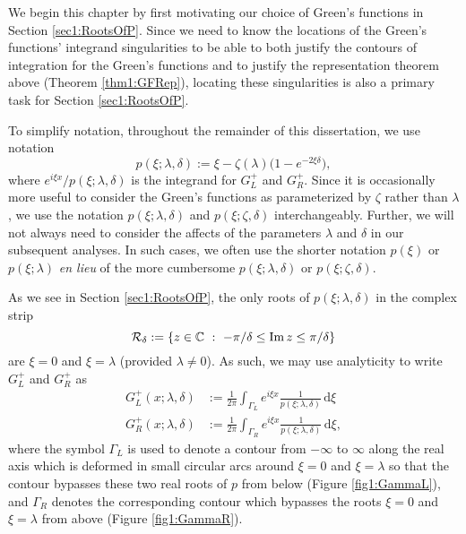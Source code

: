 \documentclass[../dissertation.tex]{subfiles}
\begin{document}
We begin this chapter by first motivating our choice of Green's functions
in Section \ref{sec1:RootsOfP}. 
Since we need to know the locations of the 
Green's functions' integrand singularities to be able to both justify 
the contours of integration for the Green's functions and
to justify the representation theorem above (Theorem \ref{thm1:GFRep}), 
locating these singularities is also a primary task for Section 
\ref{sec1:RootsOfP}.

To simplify notation, throughout the remainder of this dissertation, we use notation
\[
	p(\xi; \lambda, \delta) := \xi - \zeta(\lambda) \big( 1-e^{-2\xi \delta} \big),
	\label{sym:GFintegrand}
\]
where $e^{i\xi x} / p(\xi; \lambda, \delta)$ is the integrand for $G_L^+$ and $G_R^+$.
Since it is occasionally more useful to consider the Green's functions as parameterized 
by $\zeta$ rather than $\lambda$, we use the notation $p(\xi; \lambda, \delta)$ and
$p(\xi; \zeta, \delta)$ interchangeably. Further, we will not always need to consider
the affects of the parameters $\lambda$ and $\delta$ in our subsequent analyses. In 
such cases, we often use the shorter notation $p(\xi)$ or $p(\xi;\lambda)$ \textit{en lieu} 
of the more cumbersome $p(\xi; \lambda, \delta)$ or $p(\xi; \zeta, \delta)$.

As we see in Section \ref{sec1:RootsOfP}, the only roots of $p(\xi; \lambda, \delta)$ 
in the complex strip 
\[
	\mathcal R_\delta := \{z \in \mathbb C ~:~ -\pi/\delta \leq \operatorname{Im} z \leq \pi/\delta \}	
\]
\label{sym1:Rcal}
are $\xi = 0$ and $\xi = \lambda$ (provided $\lambda \ne 0$). As such, we may
use analyticity to write $G_L^+$ and $G_R^+$ as \label{sym:GFbndry}
\begin{align*}
	G_L^+(x; \lambda, \delta)
		&:= 
			\frac{1}{2\pi} 
			\int_{\Gamma_L} 
				e^{i\xi x} \frac{1}{p(\xi; \lambda, \delta)} 
			\, \mathrm{d}\xi \\
	G_R^+(x; \lambda, \delta) 
		&:= 
			\frac{1}{2\pi} 
				\int_{\Gamma_R} 
					e^{i\xi x} \frac{1}{p(\xi; \lambda, \delta)} 
				\, \mathrm{d}\xi,
\end{align*}
where the symbol $\Gamma_L$ \label{sym:Gamma} is used to denote a contour from $-\infty$ to 
$\infty$ along the real axis which is deformed in small circular arcs around 
$\xi = 0$ and $\xi=\lambda$ so that the contour bypasses these two real roots 
of $p$ from below (Figure \ref{fig1:GammaL}), and $\Gamma_R$ denotes the 
corresponding contour which bypasses
the roots $\xi = 0$ and $\xi=\lambda$ from above (Figure \ref{fig1:GammaR}). 
\end{document}
